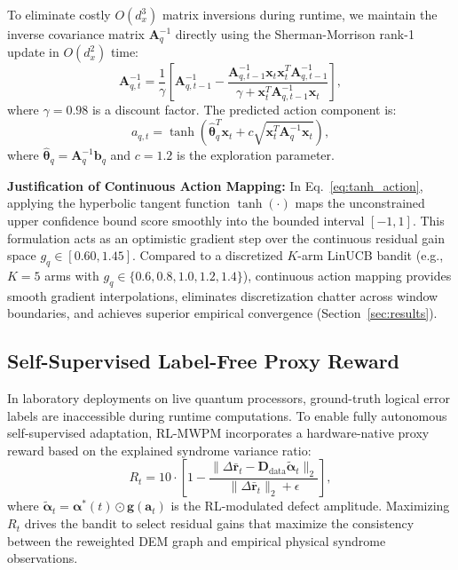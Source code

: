 \documentclass[aps,prxquantum,reprint,superscriptaddress,floatfix,nofootinbib]{revtex4-2}
\begin{document}
To eliminate costly $O(d_x^3)$ matrix inversions during runtime, we maintain the inverse covariance matrix $\mathbf{A}^{-1}_q$ directly using the Sherman-Morrison rank-1 update in $O(d_x^2)$ time:
\begin{equation}
    \mathbf{A}^{-1}_{q, t} = \frac{1}{\gamma} \left[ \mathbf{A}^{-1}_{q, t-1} - \frac{\mathbf{A}^{-1}_{q, t-1} \mathbf{x}_t \mathbf{x}_t^T \mathbf{A}^{-1}_{q, t-1}}{\gamma + \mathbf{x}_t^T \mathbf{A}^{-1}_{q, t-1} \mathbf{x}_t} \right],
    \label{eq:sherman_morrison}
\end{equation}
where $\gamma = 0.98$ is a discount factor. The predicted action component is:
\begin{equation}
    a_{q, t} = \tanh\left( \hat{\bm{\theta}}_q^T \mathbf{x}_t + c \sqrt{\mathbf{x}_t^T \mathbf{A}^{-1}_q \mathbf{x}_t} \right),
    \label{eq:tanh_action}
\end{equation}
where $\hat{\bm{\theta}}_q = \mathbf{A}^{-1}_q \mathbf{b}_q$ and $c = 1.2$ is the exploration parameter. 

\textbf{Justification of Continuous Action Mapping:} In Eq.~\eqref{eq:tanh_action}, applying the hyperbolic tangent function $\tanh(\cdot)$ maps the unconstrained upper confidence bound score smoothly into the bounded interval $[-1, 1]$. This formulation acts as an optimistic gradient step over the continuous residual gain space $g_q \in [0.60, 1.45]$. Compared to a discretized $K$-arm LinUCB bandit (e.g., $K=5$ arms with $g_q \in \{0.6, 0.8, 1.0, 1.2, 1.4\}$), continuous action mapping provides smooth gradient interpolations, eliminates discretization chatter across window boundaries, and achieves superior empirical convergence (Section~\ref{sec:results}).

\subsection{Self-Supervised Label-Free Proxy Reward}
In laboratory deployments on live quantum processors, ground-truth logical error labels are inaccessible during runtime computations. To enable fully autonomous self-supervised adaptation, RL-MWPM incorporates a hardware-native proxy reward based on the explained syndrome variance ratio:
\begin{equation}
    R_t = 10 \cdot \left[ 1 - \frac{\|\Delta \bar{\mathbf{r}}_t - \mathbf{D}_{\text{data}} \tilde{\boldsymbol{\alpha}}_t\|_2}{\|\Delta \bar{\mathbf{r}}_t\|_2 + \epsilon} \right],
    \label{eq:proxy_reward}
\end{equation}
where $\tilde{\boldsymbol{\alpha}}_t = \boldsymbol{\alpha}^*(t) \odot \mathbf{g}(\mathbf{a}_t)$ is the RL-modulated defect amplitude. Maximizing $R_t$ drives the bandit to select residual gains that maximize the consistency between the reweighted DEM graph and empirical physical syndrome observations.
\end{document}
